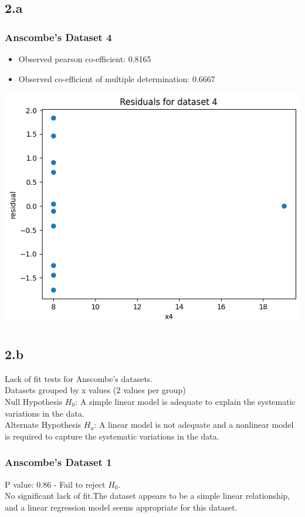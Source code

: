 \documentclass[12pt]{article}
\begin{document}
\newpage
\subsection*{2.a}
\subsubsection*{Anscombe's Dataset 4}
\begin{itemize}
    \item Observed pearson co-efficient: 0.8165
    \item Observed co-efficient of multiple determination: 0.6667
\end{itemize}
\includegraphics*[width=\linewidth]{graph2a4}

\newpage
\subsection*{2.b}
Lack of fit tests for Anscombe's datasets.
\\
Datasets grouped by x values (2 values per group)
\\[\baselineskip]
Null Hypothesis \(H_0\): A simple linear model is adequate to explain the systematic
variations in the data.
\\[\baselineskip]
Alternate Hypothesis \(H_a\): A linear model is not adequate and a nonlinear model
is required to capture the systematic variations in the data.

\subsubsection*{Anscombe's Dataset 1}
P value: 0.86 - Fail to reject \(H_0\).
\\
No significant lack of fit.The dataset appears to be a simple linear relationship,
and a linear regression model seems appropriate for this dataset.
\end{document}
